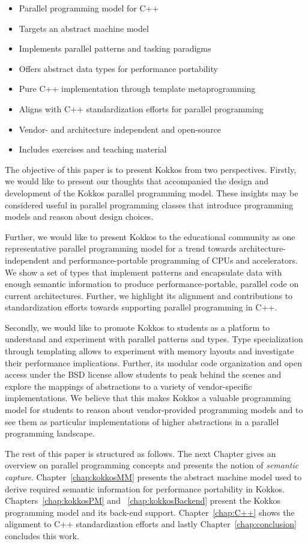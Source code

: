 \begin{itemize}
\item Parallel programming model for C++
\item Targets an abstract machine model
\item Implements parallel patterns and tasking paradigms
\item Offers abstract data types for performance portability
\item Pure C++ implementation through template metaprogramming
\item Aligns with C++ standardization efforts for parallel programming
\item Vendor- and architecture independent and open-source
\item Includes exercises and teaching material
\end{itemize}

The objective of this paper is to present Kokkos from two perspectives. Firstly, we would like to present our thoughts that accompanied the design and development of the Kokkos parallel programming model. These insights may be considered useful in parallel programming classes that introduce programming models and reason about design choices.

Further, we would like to present Kokkos to the educational community as one representative parallel programming model for a trend towards architecture-independent and performance-portable programming of CPUs and accelerators. We show a set of types that implement patterns and encapsulate data with enough semantic information to produce performance-portable, parallel code on current architectures. Further, we highlight its alignment and contributions to standardization efforts towards supporting parallel programming in C++. 

Secondly, we would like to promote Kokkos to students as a platform to understand and experiment with parallel patterns and types. Type specialization through templating allows to experiment with memory layouts and investigate their performance implications. Further, its modular code organization and open access under the BSD license allow students to peak behind the scenes and explore the mappings of abstractions to a variety of vendor-specific implementations. We believe that this makes Kokkos a valuable programming model for students to reason about vendor-provided programming models and to see them as particular implementations of higher abstractions in a parallel programming landscape.

The rest of this paper is structured as follows. The next Chapter gives an overview on parallel programming concepts and presents the notion of \emph{semantic capture}. Chapter~\ref{chap:kokkosMM} presents the abstract machine model used to derive required semantic information for performance portability in Kokkos. Chapters~\ref{chap:kokkosPM} and ~\ref{chap:kokkosBackend} present the Kokkos programming model and its back-end support. Chapter~\ref{chap:C++} shows the alignment to C++ standardization efforts and lastly Chapter~\ref{chap:conclusion} concludes this work.
